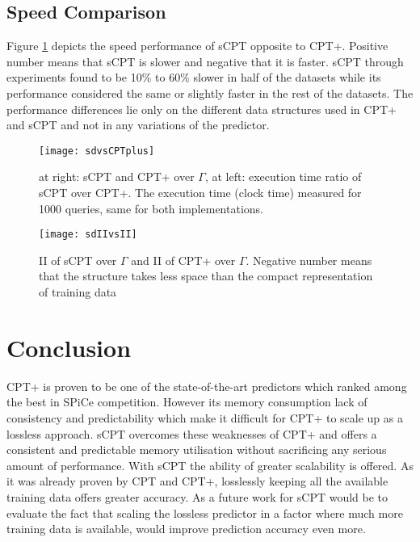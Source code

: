  \subsection*{Speed Comparison}
Figure \ref{fig:sdvsCPTplus} depicts the speed performance of sCPT opposite to CPT+. Positive number means that sCPT is slower and negative that it is faster. sCPT through experiments found to be 10\% to 60\% slower in half of the datasets while its performance considered the same or slightly faster in the rest of the datasets. The performance differences lie only on the different data structures used in CPT+ and sCPT and not in any variations of the predictor. 
\begin{figure}[h]
    \centering
    \texttt{[image: sdvsCPTplus]}
    \caption{at right: sCPT and CPT+ over $\Gamma$, at left: execution time ratio of sCPT over CPT+. The execution time (clock time) measured for 1000 queries, same for both implementations.}
    \label{fig:sdvsCPTplus}
\end{figure}

\begin{figure}[h]
    \centering
    \texttt{[image: sdIIvsII]}
    \caption{II of sCPT over $\Gamma$ and II of CPT+ over $\Gamma$. Negative number means that the structure takes less space than the compact representation of training data}
    \label{fig:sdIIvsII}
\end{figure}

\section{Conclusion}
CPT+ is proven to be one of the state-of-the-art predictors which ranked among the best in SPiCe competition. However its memory consumption lack of consistency and predictability which make it difficult for CPT+ to scale up as a lossless approach. sCPT overcomes these weaknesses of CPT+ and offers a consistent and predictable memory utilisation without sacrificing any serious amount of performance. With sCPT the ability of greater scalability is offered. As it was already proven by CPT and CPT+, losslessly keeping all the available training data offers greater accuracy. As a future work for sCPT would be to evaluate the fact that scaling the lossless predictor in a factor where much more training data is available, would improve prediction accuracy even more.


\newpage